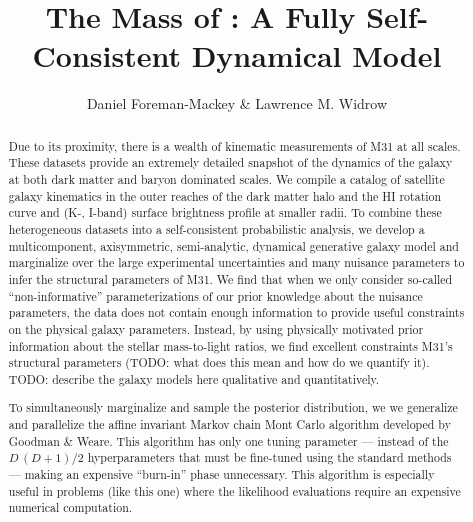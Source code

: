 \documentclass[preprint,12pt]{aastex}
\newcommand{\andromeda}{\object[M31]{Andromeda}}
\begin{document}
\title{The Mass of \andromeda: A Fully Self-Consistent Dynamical Model}


\author{Daniel Foreman-Mackey\altaffilmark{\ref{affil:email},
                \ref{affil:nyu},\ref{affil:queens}}
    \& Lawrence M. Widrow\altaffilmark{\ref{affil:queens}}}


\begin{abstract}

    Due to its proximity, there is a wealth of kinematic measurements of M31
    at all scales. These datasets provide an extremely detailed snapshot of the
    dynamics of the galaxy at both dark matter and baryon dominated scales. We
    compile a catalog of satellite galaxy kinematics in the outer reaches of the
    dark matter halo and the HI rotation curve and (K-, I-band) surface brightness
    profile at smaller radii.
    To combine these heterogeneous datasets into a self-consistent probabilistic
    analysis, we develop a multicomponent, axisymmetric, semi-analytic, dynamical
    generative galaxy model and marginalize over the large experimental
    uncertainties and many nuisance parameters to infer the structural parameters
    of M31.
    We find that when we only consider so-called ``non-informative''
    parameterizations of our prior knowledge about the nuisance parameters, the
    data does not contain enough information to provide useful constraints on
    the physical galaxy parameters. Instead, by using physically motivated
    prior information about the stellar mass-to-light ratios, we find excellent
    constraints M31's structural parameters (TODO: what does this mean and how do
    we quantify it). TODO: describe the galaxy models here qualitative and
    quantitatively.

    To simultaneously marginalize and sample the posterior distribution, we
    we generalize and parallelize the affine invariant Markov chain Mont Carlo
    algorithm developed by Goodman \& Weare. This algorithm has only one tuning
    parameter --- instead of the $D\,(D+1)/2$ hyperparameters that must
    be fine-tuned using the standard methods --- making an expensive ``burn-in''
    phase unnecessary. This algorithm is especially useful in problems (like this
    one) where the likelihood evaluations require an expensive numerical
    computation.

\end{abstract}
\end{document}
